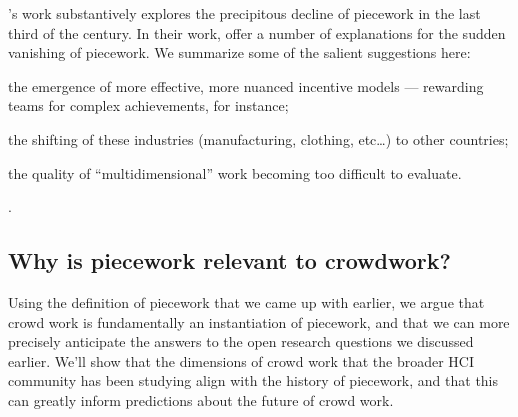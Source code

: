 \documentclass[trackingWork]{subfiles}
\begin{document}
\citeauthor{hart2013rise}'s work substantively explores the precipitous decline of piecework in the last third of the  century.
In their work, \citeauthor{hart2013rise} offer a number of explanations for the sudden vanishing of piecework.
We summarize some of the salient suggestions here:
\begin{inlinelist}
\item the emergence of more effective, more nuanced incentive models
--- rewarding teams for complex achievements, for instance;
\item the shifting of these industries (manufacturing, clothing, etc\dots)
to other countries;
\item the quality of ``multidimensional'' work becoming too difficult to evaluate.
\end{inlinelist}
\cite{hart2013rise}.



\subsection{Why is piecework relevant to crowdwork?}
Using the definition of piecework that we came up with earlier, we argue that
crowd work is fundamentally an instantiation of piecework, and
that we can more precisely anticipate the answers to the open research questions we discussed earlier.
We'll show that the dimensions of crowd work that the broader HCI community has been studying
align with the history of piecework, and that this can greatly inform predictions about the future of crowd work.


\onlyinsubfile{
  \printbibliography
  }
\end{document}
